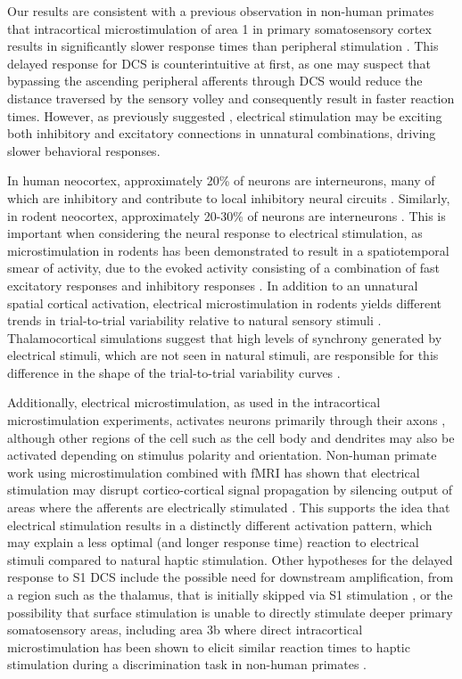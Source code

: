 Our results are consistent with a previous observation in non-human primates that intracortical microstimulation of area 1 in primary somatosensory cortex results in significantly slower response times than peripheral stimulation \cite{Godlove2014a}. This delayed response for DCS is counterintuitive at first, as one may suspect that bypassing the ascending peripheral afferents through DCS would reduce the distance traversed by the sensory volley and consequently result in faster reaction times. However, as previously suggested \cite{Godlove2014a}, electrical stimulation may be exciting both inhibitory and excitatory connections in unnatural combinations, driving slower behavioral responses.

In human neocortex, approximately 20\% of neurons are interneurons, many of which are inhibitory and contribute to local inhibitory neural circuits \cite{Arber2013}. Similarly, in rodent neocortex, approximately 20-30\% of neurons are interneurons \cite{Markram2004a}. This is important when considering the neural response to electrical stimulation, as microstimulation in rodents has been demonstrated to result in a spatiotemporal smear of activity, due to the evoked activity consisting of a combination of fast excitatory responses and inhibitory responses \cite{Butovas2003a}. In addition to an unnatural spatial cortical activation, electrical microstimulation in rodents yields different trends in trial-to-trial variability relative to natural sensory stimuli \cite{Millard2015a}. Thalamocortical simulations suggest that high levels of synchrony generated by electrical stimuli, which are not seen in natural stimuli, are responsible for this difference in the shape of the trial-to-trial variability curves \cite{Millard2015a}.

Additionally, electrical microstimulation, as used in the intracortical microstimulation experiments, activates neurons primarily through their axons \cite{Ranck1975,Tehovnik2006a}, although other regions of the cell such as the cell body and dendrites may also be activated depending on stimulus polarity and orientation. Non-human primate work using microstimulation combined with fMRI has shown that electrical stimulation may disrupt cortico-cortical signal propagation by silencing output of areas where the afferents are electrically stimulated \cite{Logothetis2010}. This supports the idea that electrical stimulation results in a distinctly different activation pattern, which may explain a less optimal (and longer response time) reaction to electrical stimuli compared to natural haptic stimulation. Other hypotheses for the delayed response to S1 DCS include the possible need for downstream amplification, from a region such as the thalamus, that is initially skipped via S1 stimulation \cite{Godlove2014a}, or the possibility that surface stimulation is unable to directly stimulate deeper primary somatosensory areas, including area 3b where direct intracortical microstimulation has been shown to elicit similar reaction times to haptic stimulation during a discrimination task in non-human primates \cite{Romo2000a}.


